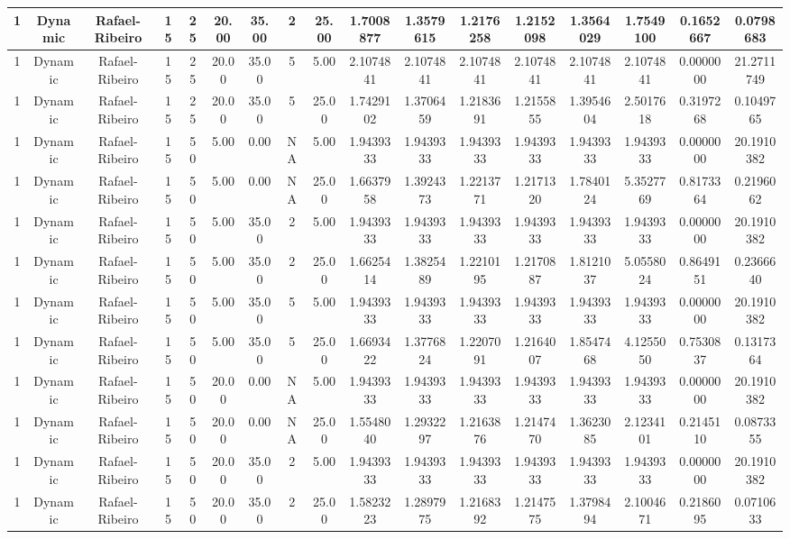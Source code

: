 \begin{longtable}{ | c | c | c | c | c | c | c | c | c | c | c | c | c | c | c | c | c | }
	\hline
	1	&	Dynamic	&	Rafael-Ribeiro	&	15	&	25	&	20.00	&	35.00	&	2	&	25.00	&	1.7008877	&	1.3579615	&	1.2176258	&	1.2152098	&	1.3564029	&	1.7549100	&	0.1652667	&	0.0798683 \\
	\hline
	1	&	Dynamic	&	Rafael-Ribeiro	&	15	&	25	&	20.00	&	35.00	&	5	&	5.00	&	2.1074841	&	2.1074841	&	2.1074841	&	2.1074841	&	2.1074841	&	2.1074841	&	0.0000000	&	21.2711749 \\
	\hline
	1	&	Dynamic	&	Rafael-Ribeiro	&	15	&	25	&	20.00	&	35.00	&	5	&	25.00	&	1.7429102	&	1.3706459	&	1.2183691	&	1.2155855	&	1.3954604	&	2.5017618	&	0.3197268	&	0.1049765 \\
	\hline
	1	&	Dynamic	&	Rafael-Ribeiro	&	15	&	50	&	5.00	&	0.00	&	NA	&	5.00	&	1.9439333	&	1.9439333	&	1.9439333	&	1.9439333	&	1.9439333	&	1.9439333	&	0.0000000	&	20.1910382 \\
	\hline
	1	&	Dynamic	&	Rafael-Ribeiro	&	15	&	50	&	5.00	&	0.00	&	NA	&	25.00	&	1.6637958	&	1.3924373	&	1.2213771	&	1.2171320	&	1.7840124	&	5.3527769	&	0.8173364	&	0.2196062 \\
	\hline
	1	&	Dynamic	&	Rafael-Ribeiro	&	15	&	50	&	5.00	&	35.00	&	2	&	5.00	&	1.9439333	&	1.9439333	&	1.9439333	&	1.9439333	&	1.9439333	&	1.9439333	&	0.0000000	&	20.1910382 \\
	\hline
	1	&	Dynamic	&	Rafael-Ribeiro	&	15	&	50	&	5.00	&	35.00	&	2	&	25.00	&	1.6625414	&	1.3825489	&	1.2210195	&	1.2170887	&	1.8121037	&	5.0558024	&	0.8649151	&	0.2366640 \\
	\hline
	1	&	Dynamic	&	Rafael-Ribeiro	&	15	&	50	&	5.00	&	35.00	&	5	&	5.00	&	1.9439333	&	1.9439333	&	1.9439333	&	1.9439333	&	1.9439333	&	1.9439333	&	0.0000000	&	20.1910382 \\
	\hline
	1	&	Dynamic	&	Rafael-Ribeiro	&	15	&	50	&	5.00	&	35.00	&	5	&	25.00	&	1.6693422	&	1.3776824	&	1.2207091	&	1.2164007	&	1.8547468	&	4.1255050	&	0.7530837	&	0.1317364 \\
	\hline
	1	&	Dynamic	&	Rafael-Ribeiro	&	15	&	50	&	20.00	&	0.00	&	NA	&	5.00	&	1.9439333	&	1.9439333	&	1.9439333	&	1.9439333	&	1.9439333	&	1.9439333	&	0.0000000	&	20.1910382 \\
	\hline
	1	&	Dynamic	&	Rafael-Ribeiro	&	15	&	50	&	20.00	&	0.00	&	NA	&	25.00	&	1.5548040	&	1.2932297	&	1.2163876	&	1.2147470	&	1.3623085	&	2.1234101	&	0.2145110	&	0.0873355 \\
	\hline
	1	&	Dynamic	&	Rafael-Ribeiro	&	15	&	50	&	20.00	&	35.00	&	2	&	5.00	&	1.9439333	&	1.9439333	&	1.9439333	&	1.9439333	&	1.9439333	&	1.9439333	&	0.0000000	&	20.1910382 \\
	\hline
	1	&	Dynamic	&	Rafael-Ribeiro	&	15	&	50	&	20.00	&	35.00	&	2	&	25.00	&	1.5823223	&	1.2897975	&	1.2168392	&	1.2147575	&	1.3798494	&	2.1004671	&	0.2186095	&	0.0710633 \\

\end{longtable}
